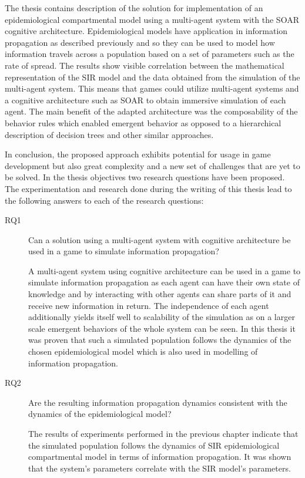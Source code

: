 \label{chapter:conclusions}

The thesis contains description of the solution for implementation of an epidemiological compartmental model using a multi-agent system with the SOAR cognitive architecture.
Epidemiological models have application in information propagation as described previously and so they can be used to model how information travels across a population based on a set of parameters such as the rate of spread.
The results show visible correlation between the mathematical representation of the SIR model and the data obtained from the simulation of the multi-agent system.
This means that games could utilize multi-agent systems and a cognitive architecture such as SOAR to obtain immersive simulation of each agent.
The main benefit of the adapted architecture was the composability of the behavior rules which enabled emergent behavior as opposed to a hierarchical description of decision trees and other similar approaches.

In conclusion, the proposed approach exhibits potential for usage in game development but also great complexity and a new set of challenges that are yet to be solved.
In the thesis objectives two research questions have been proposed.
The experimentation and research done during the writing of this thesis lead to the following answers to each of the research questions:

\begin{description}
    \item[RQ1] Can a solution using a multi-agent system with cognitive architecture be used in a game to simulate information propagation?
    \item[] A multi-agent system using cognitive architecture can be used in a game to simulate information propagation as each agent can have their own state of knowledge and by interacting with other agents can share parts of it and receive new information in return. The independence of each agent additionally yields itself well to scalability of the simulation as on a larger scale emergent behaviors of the whole system can be seen. In this thesis it was proven that such a simulated population follows the dynamics of the chosen epidemiological model which is also used in modelling of information propagation.
    \item[RQ2] Are the resulting information propagation dynamics consistent with the dynamics of the epidemiological model?
    \item[] The results of experiments performed in the previous chapter indicate that the simulated population follows the dynamics of SIR epidemiological compartmental model in terms of information propagation. It was shown that the system's parameters correlate with the SIR model's parameters.
\end{description}

